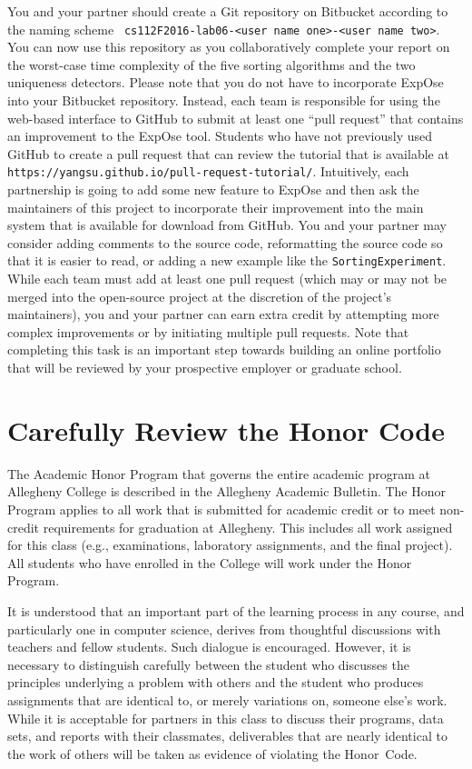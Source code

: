 You and your partner should create a Git repository on Bitbucket according to the naming scheme {\tt
cs112F2016-lab06-<user name one>-<user name two>}. You can now use this repository as you collaboratively complete your
report on the worst-case time complexity of the five sorting algorithms and the two uniqueness detectors. Please note
that you do not have to incorporate {\sc ExpOse} into your Bitbucket repository. Instead, each team is responsible for
using the web-based interface to GitHub to submit at least one ``pull request'' that contains an improvement to the {\sc
ExpOse} tool. Students who have not previously used GitHub to create a pull request that can review the tutorial that is
available at {\tt https://yangsu.github.io/pull-request-tutorial/}. Intuitively, each partnership is going to add some
new feature to {\sc ExpOse} and then ask the maintainers of this project to incorporate their improvement into the main
system that is available for download from GitHub. You and your partner may consider adding comments to the source code,
reformatting the source code so that it is easier to read, or adding a new example like the {\tt SortingExperiment}.
While each team must add at least one pull request (which may or may not be merged into the open-source project at the
discretion of the project's maintainers), you and your partner can earn extra credit by attempting more complex
improvements or by initiating multiple pull requests. Note that completing this task is an important step towards
building an online portfolio that will be reviewed by your prospective employer or graduate school.

\section*{Carefully Review the Honor Code}

The Academic Honor Program that governs the entire academic program at Allegheny College is described in the Allegheny
Academic Bulletin. The Honor Program applies to all work that is submitted for academic credit or to meet non-credit
requirements for graduation at Allegheny. This includes all work assigned for this class (e.g., examinations, laboratory
assignments, and the final project). All students who have enrolled in the College will work under the Honor Program.

\noindent It is understood that an important part of the learning process in any course, and particularly one in
computer science, derives from thoughtful discussions with teachers and fellow students.  Such dialogue is encouraged.
However, it is necessary to distinguish carefully between the student who discusses the principles underlying a problem
with others and the student who produces assignments that are identical to, or merely variations on, someone else's
work. While it is acceptable for partners in this class to discuss their programs, data sets, and reports with their
classmates, deliverables that are nearly identical to the work of others will be taken as evidence of violating the
\mbox{Honor Code}.

